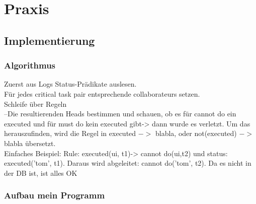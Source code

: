 
\chapter{Praxis} %

\label{Chapter5} %



\section{Implementierung}
\subsection{Algorithmus}
Zuerst aus Logs Status-Prädikate auslesen.\\
Für jedes critical task pair entsprechende collaborateurs setzen.\\
Schleife über Regeln\\
--Die resultierenden Heads bestimmen und schauen, ob es für cannot do ein executed und für must do kein executed gibt-> dann wurde es verletzt. Um das herauszufinden, wird die Regel in executed $ - >$ blabla, oder not(executed) $- >$ blabla übersetzt.\\
 
Einfaches Beispiel: Rule: executed(ui, t1)-> cannot do(ui,t2) und status: executed('tom', t1). Daraus wird abgeleitet: cannot do('tom', t2). Da es nicht in der DB ist, ist alles OK

\subsection{Aufbau mein Programm}

